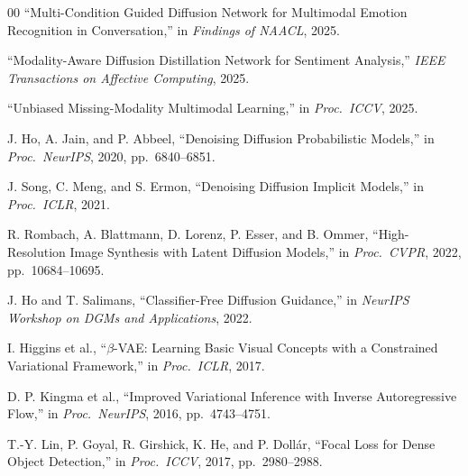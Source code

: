 \documentclass[conference]{IEEEtran}
\begin{document}
\begin{thebibliography}{00}
``Multi-Condition Guided Diffusion Network for Multimodal Emotion Recognition
in Conversation,'' in \textit{Findings of NAACL}, 2025.

``Modality-Aware Diffusion Distillation Network for Sentiment Analysis,''
\textit{IEEE Transactions on Affective Computing}, 2025.

``Unbiased Missing-Modality Multimodal Learning,'' in \textit{Proc.\ ICCV},
2025.

J. Ho, A. Jain, and P. Abbeel, ``Denoising Diffusion Probabilistic Models,''
in \textit{Proc.\ NeurIPS}, 2020, pp.~6840--6851.

J. Song, C. Meng, and S. Ermon, ``Denoising Diffusion Implicit Models,''
in \textit{Proc.\ ICLR}, 2021.

R. Rombach, A. Blattmann, D. Lorenz, P. Esser, and B. Ommer,
``High-Resolution Image Synthesis with Latent Diffusion Models,''
in \textit{Proc.\ CVPR}, 2022, pp.~10684--10695.

J. Ho and T. Salimans, ``Classifier-Free Diffusion Guidance,''
in \textit{NeurIPS Workshop on DGMs and Applications}, 2022.

I. Higgins et al., ``$\beta$-VAE: Learning Basic Visual Concepts with a
Constrained Variational Framework,'' in \textit{Proc.\ ICLR}, 2017.

D. P. Kingma et al., ``Improved Variational Inference with Inverse
Autoregressive Flow,'' in \textit{Proc.\ NeurIPS}, 2016, pp.~4743--4751.

T.-Y. Lin, P. Goyal, R. Girshick, K. He, and P. Doll\'ar, ``Focal Loss for
Dense Object Detection,'' in \textit{Proc.\ ICCV}, 2017, pp.~2980--2988.

\end{thebibliography}
\end{document}
